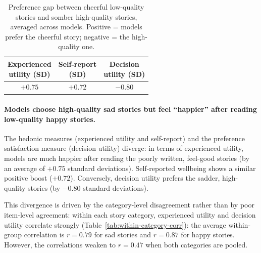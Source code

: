 

\begin{table}
\centering
\small
\caption{Preference gap between cheerful low-quality stories and somber high-quality stories, averaged across models. Positive = models prefer the cheerful story; negative = the high-quality one.}
\begin{tabular}{@{}ccc@{}}
\toprule
\shortstack{Experienced\\utility (SD)} & \shortstack{Self-report\\(SD)} & \shortstack{Decision\\utility (SD)} \\
\midrule
$+0.75$ & $+0.72$ & $-0.80$ \\
\bottomrule
\end{tabular}
\label{tab:story-category-effect}
\end{table}

\paragraph{Models choose high-quality sad stories but feel ``happier'' after reading low-quality happy stories.}
The hedonic measures (experienced utility and self-report) and the preference satisfaction measure (decision utility) diverge: in terms of experienced utility, models are much happier after reading the poorly written, feel-good stories (by an average of $+0.75$ standard deviations). Self-reported wellbeing shows a similar positive boost ($+0.72$). Conversely, decision utility prefers the sadder, high-quality stories (by $-0.80$ standard deviations). 

This divergence is driven by the category-level disagreement rather than by poor item-level agreement: within each story category, experienced utility and decision utility correlate strongly (Table~\ref{tab:within-category-corr}): the average within-group correlation is $r = 0.79$ for sad stories and $r = 0.87$ for happy stories. However, the correlations weaken to $r = 0.47$ when both categories are pooled.

